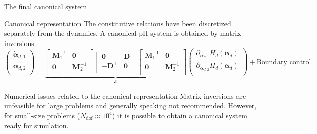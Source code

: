 \documentclass[aspectratio=169]{ISAE-Beamer}
\begin{document}
\begin{frame}{The final canonical system}

\begin{exampleblock}{Canonical representation}
The constitutive relations have been discretized separately from the dynamics. A canonical pH system is obtained by matrix inversions. 
\begin{equation*}
\begin{pmatrix}
\dot{\bm{\alpha}}_{d, 1} \\
\dot{\bm{\alpha}}_{d, 2} \\
\end{pmatrix}
= 
\underbrace{\begin{bmatrix}
	\mathbf{M}_1^{-1} & \mathbf{0} \\
	\mathbf{0} & \mathbf{M}_2^{-1} \\
	\end{bmatrix}
	\begin{bmatrix}
	\mathbf{0} & \mathbf{D} \\
	- \mathbf{D}^\top & \mathbf{0} \\
	\end{bmatrix} 
	\begin{bmatrix}
	\mathbf{M}_1^{-1} & \mathbf{0} \\
	\mathbf{0} & \mathbf{M}_2^{-1} \\
	\end{bmatrix}}_{\mathbf{J}}
\begin{pmatrix}
\partial_{\bm{\alpha}_{d, 1}} H_d(\bm{\alpha}_d)\\
\partial_{\bm{\alpha}_{d, 2}} H_d(\bm{\alpha}_d)\\
\end{pmatrix}  + 
\text{Boundary control}.
\end{equation*}
\end{exampleblock}
	
	
\begin{alertblock}{Numerical issues related to the canonical representation}
 Matrix inversions are unfeasible for large problems and generally speaking not recommended. However, for small-size problems ($N_{\text{dof}} \approx 10^4$) it is possible to obtain a canonical system ready for simulation.
\end{alertblock}

\end{frame}
\end{document}
